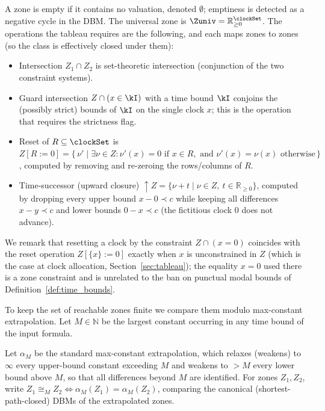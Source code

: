 A zone is {empty} if it contains no valuation, denoted $\emptyset$; emptiness is detected as a negative cycle in the DBM. The {universal} zone is $\Zuniv = \mathbb{R}_{\ge 0}^{\clockSet}$. The operations the tableau requires are the following, and each maps zones to zones (so the class is effectively closed under them):
\begin{itemize}
  \item {Intersection} $Z_1\cap Z_2$ is set-theoretic intersection (conjunction of the two constraint systems).
  \item {Guard intersection} $Z\cap(x\in \kI)$ with a time bound $\kI$ conjoins the (possibly strict) bounds of $\kI$ on the single clock $x$; this is the operation that requires the strictness flag.
  \item {Reset} of $R\subseteq\clockSet$ is $Z[R := 0] = \{\, \nu' \mid \exists \nu \in Z :\nu'(x)=0 \text{ if } x\in R,\text{ and } \nu'(x)=\nu(x) \text{ otherwise} \,\}$, computed by removing and re-zeroing the rows/columns of $R$.
  \item {Time-successor} (upward closure) $\uparrow Z = \{\nu + t \mid \nu \in Z,\ t \in \mathbb{R}_{\ge 0}\}$, computed by dropping every upper bound $x-0\prec c$ while keeping all differences $x-y\prec c$ and lower bounds $0-x\prec c$ (the fictitious clock $0$ does not advance).
\end{itemize}
We remark that resetting a clock by the {constraint} $Z\cap(x=0)$ coincides with the {reset} operation $Z[\{x\}:=0]$ exactly when $x$ is unconstrained in $Z$ (which is the case at clock allocation, Section~\ref{sec:tableau}); the equality $x=0$ used there is a zone constraint and is unrelated to the ban on punctual {modal} bounds of Definition~\ref{def:time_bounds}.

To keep the set of reachable zones finite we compare them modulo {max-constant extrapolation}. Let $M\in\mathbb{N}$ be the largest constant occurring in any time bound of the input formula.
\begin{definition}\label{def:zone_equiv}
Let $\alpha_M$ be the standard max-constant extrapolation, which relaxes (weakens) to $\infty$ every upper-bound constant exceeding $M$ and weakens to $>M$ every lower bound above $M$, so that all differences beyond $M$ are identified. For zones $Z_1,Z_2$, write $Z_1 \cong_M Z_2 \iff \alpha_M(Z_1)=\alpha_M(Z_2)$, comparing the {canonical} (shortest-path-closed) DBMs of the extrapolated zones.
\end{definition}

